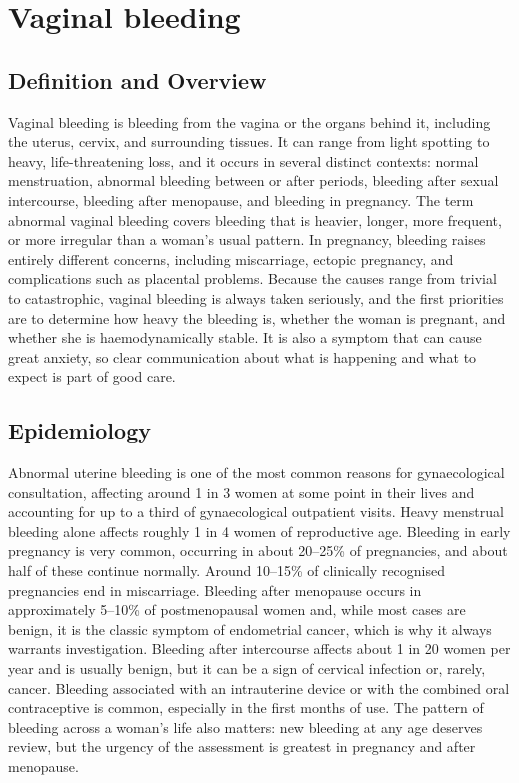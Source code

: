 \chapter{Vaginal bleeding}

\section*{Definition and Overview}
Vaginal bleeding is bleeding from the vagina or the organs behind it, including the uterus, cervix, and surrounding tissues. It can range from light spotting to heavy, life-threatening loss, and it occurs in several distinct contexts: normal menstruation, abnormal bleeding between or after periods, bleeding after sexual intercourse, bleeding after menopause, and bleeding in pregnancy. The term abnormal vaginal bleeding covers bleeding that is heavier, longer, more frequent, or more irregular than a woman's usual pattern. In pregnancy, bleeding raises entirely different concerns, including miscarriage, ectopic pregnancy, and complications such as placental problems. Because the causes range from trivial to catastrophic, vaginal bleeding is always taken seriously, and the first priorities are to determine how heavy the bleeding is, whether the woman is pregnant, and whether she is haemodynamically stable. It is also a symptom that can cause great anxiety, so clear communication about what is happening and what to expect is part of good care.

\section*{Epidemiology}
Abnormal uterine bleeding is one of the most common reasons for gynaecological consultation, affecting around 1 in 3 women at some point in their lives and accounting for up to a third of gynaecological outpatient visits. Heavy menstrual bleeding alone affects roughly 1 in 4 women of reproductive age. Bleeding in early pregnancy is very common, occurring in about 20--25\% of pregnancies, and about half of these continue normally. Around 10--15\% of clinically recognised pregnancies end in miscarriage. Bleeding after menopause occurs in approximately 5--10\% of postmenopausal women and, while most cases are benign, it is the classic symptom of endometrial cancer, which is why it always warrants investigation. Bleeding after intercourse affects about 1 in 20 women per year and is usually benign, but it can be a sign of cervical infection or, rarely, cancer. Bleeding associated with an intrauterine device or with the combined oral contraceptive is common, especially in the first months of use. The pattern of bleeding across a woman's life also matters: new bleeding at any age deserves review, but the urgency of the assessment is greatest in pregnancy and after menopause.

